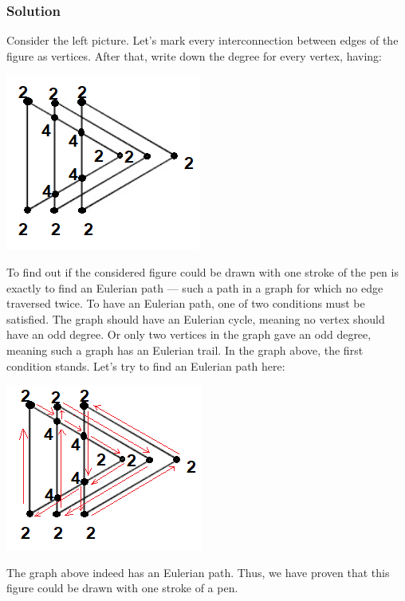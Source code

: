 \documentclass[a4paper]{article}
\begin{document}
\subsubsection*{Solution}
Consider the left picture. Let's mark every interconnection between edges of the figure as vertices. After that, write down the degree for every vertex, having:
\begin{center}
\includegraphics{task3_1.png}  
\end{center}
\par To find out if the considered figure could be drawn with one stroke of the pen is exactly to find an Eulerian path — such a path in a graph for which no edge traversed twice. To have an Eulerian path, one of two conditions must be satisfied. The graph should have an Eulerian cycle, meaning no vertex should have an odd degree. Or only two vertices in the graph gave an odd degree, meaning such a graph has an Eulerian trail. In the graph above, the first condition stands. Let's try to find an Eulerian path here:
\begin{center}
\includegraphics{task3_2.png}  
\end{center}
The graph above indeed has an Eulerian path. Thus, we have proven that this figure could be drawn with one stroke of a pen. \\
\end{document}

